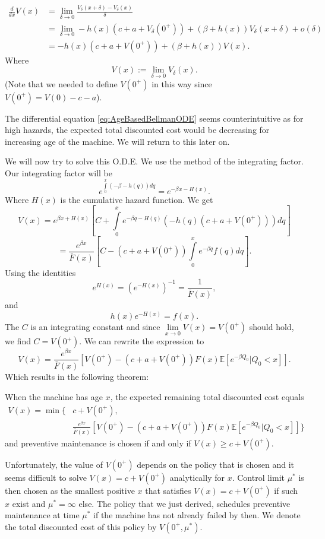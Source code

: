 \begin{equation}\label{eq:AgeBasedBellmanODE}
\begin{split}
\frac{d}{dx}V(x)&=\lim\limits_{\delta\rightarrow 0} \frac{V_\delta(x+\delta)-V_\delta(x)}{\delta} \\
&=\lim\limits_{\delta\rightarrow 0} -h(x)(c+a+ V_\delta(0^+))+(\beta+ h(x)) V_\delta(x+\delta)+o(\delta)\\
&=-h(x)(c+a+ V(0^+))+(\beta+ h(x)) V(x).
\end{split}
\end{equation}
Where
$$
V(x):=\lim\limits_{\delta\rightarrow 0} V_\delta(x).
$$
(Note that we needed to define $V(0^+)$ in this way since $V(0^+)=V(0)-c-a$).
\begin{remark}\label{remark:AgeBasedWeirdODE}
	The differential equation \eqref{eq:AgeBasedBellmanODE} seems counterintuitive as for high hazards, the expected total discounted cost would be decreasing for increasing age of the machine.
	We will return to this later on.
\end{remark}
We will now try to solve this O.D.E.
We use the method of the integrating factor.
Our integrating factor will be
$$
e^{\int\limits_0^x (-\beta - h(q))dq}=e^{-\beta x -H(x)}.
$$
Where $H(x)$ is the cumulative hazard function.
We get
$$
V(x)=e^{\beta x +H(x)} [C + \int\limits_0^x e^{-\beta q -H(q)}(-h(q)(c+a+V(0^+)))dq]
$$
$$
=\frac{e^{\beta x}}{\bar F(x)} [C - (c+a+V(0^+))\int\limits_0^x e^{-\beta q}f(q)dq].
$$
Using the identities 
\[e^{H(x)}=(e^{-H(x)})^{-1}=\frac{1}{\bar F(x)},\]
and
\[h(x)e^{-H(x)}=f(x).\]
The $C$ is an integrating constant and since $\lim\limits_{x\rightarrow 0}V(x)=V(0^+)$ should hold, we find $C=V(0^+)$.
We can rewrite the expression to
$$
V(x)=\frac{e^{\beta x}}{\bar F(x)} [V(0^+)  - (c+a+V(0^+))F(x)\mathbb{E}[e^{-\beta Q_0}|Q_0<x]].
$$
Which results in the following theorem:
\begin{theorem}
	When the machine has age $x$, the expected remaining total discounted cost equals
	\begin{equation}\label{eq:AgeBasedSolvedBellman}
	\begin{split}
	V(x)=\min\{&c+V(0^+),\\
	&\frac{ e^{\beta x}}{\bar F(x)} [V(0^+) - (c+a+V(0^+))F(x)\mathbb{E}[e^{-\beta Q_0}|Q_0<x]]
	\}
	\end{split}
	\end{equation}
	and preventive maintenance is chosen if and only if $V(x)\geq c+V(0^+)$.
\end{theorem}
Unfortunately, the value of $V(0^+)$ depends on the policy that is chosen and it seems difficult to solve $V(x)=c+V(0^+)$ analytically for $x$.
Control limit $\mu^*$ is then chosen as the smallest positive $x$ that satisfies $V(x)=c+V(0^+)$ if such $x$ exist and $\mu^*=\infty$ else.
The policy that we just derived, schedules preventive maintenance at time $\mu^*$ if the machine has not already failed by then.
We denote the total discounted cost of this policy by $V(0^+,\mu^*)$.

